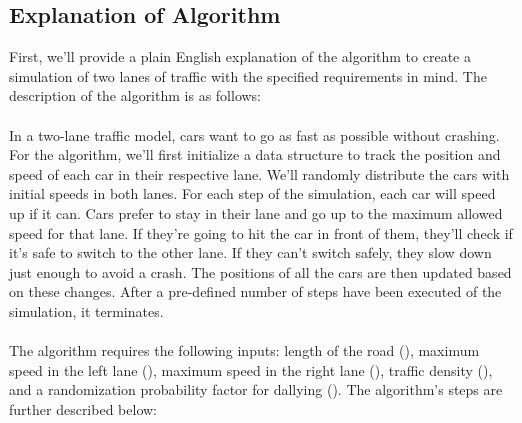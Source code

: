 \documentclass{article}
\begin{document}
\subsection{Explanation of Algorithm}
First, we'll provide a plain English explanation of the algorithm to create a simulation of two lanes of traffic with the specified requirements in mind. The description of the algorithm is as follows: \\\\
In a two-lane traffic model, cars want to go as fast as possible without crashing. For the algorithm, we'll first initialize a data structure to track the position and speed of each car in their respective lane. We'll randomly distribute the cars with initial speeds in both lanes. For each step of the simulation, each car will speed up if it can. Cars prefer to stay in their lane and go up to the maximum allowed speed for that lane. If they're going to hit the car in front of them, they'll check if it's safe to switch to the other lane. If they can't switch safely, they slow down just enough to avoid a crash. The positions of all the cars are then updated based on these changes. After a pre-defined number of steps have been executed of the simulation, it terminates.\\\\
The algorithm requires the following inputs: length of the road (), maximum speed in the left lane (), maximum speed in the right lane (), traffic density (), and a randomization probability factor for dallying (). The algorithm's steps are further described below: 
\end{document}
